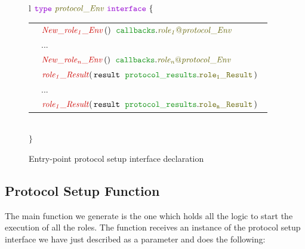 \documentclass[12pt,twoside]{report}
\begin{document}
\begin{figure}[!h]
    \begin{center}
        \begin{tabular}{l}
            $\gotype\ \interfacename{protocol\_Env}\ \gointerface\ \{$ \\[3pt]
            \begin{tabular}{ll}
                \indent & $\functionname{New\_role_1\_Env}\,()\;\ \pkginterfaceaccess{callbacks}{role_1@protocol\_Env}$\\[3.5pt]
                \indent & ...\\[3.5pt]
                \indent & $\functionname{New\_role_n\_Env}\,()\;\ \pkginterfaceaccess{callbacks}{role_n@protocol\_Env}$\\[10pt]
                \indent & $\functionname{role_1\_Result}(\,\varname{result}\ \;\pkgstructaccess{protocol\_results}{role_1\_Result}\,)\;\ $\\[3.5pt]
                \indent & ...\\[3.5pt]
                \indent & $\functionname{role_1\_Result}(\,\varname{result}\ \;\pkgstructaccess{protocol\_results}{role_n\_Result}\,)\;\ $\\[3.5pt]
            \end{tabular}\\[3pt]
            $\}$
        \end{tabular}

    \end{center}
    \caption{Entry-point protocol setup interface declaration}
    \label{setup-interface-gen}
\end{figure}

\subsection{Protocol Setup Function}

The main function we generate is the one which holds all the logic to start the execution of all the roles. The function receives an instance of the protocol setup interface we have just described as a parameter and does the following:
\end{document}
